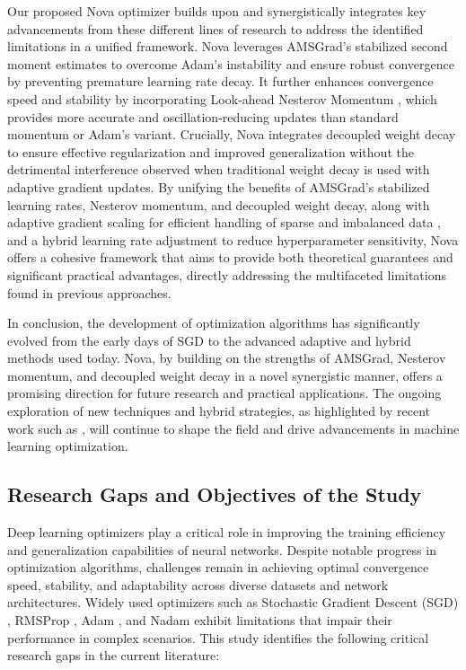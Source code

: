 \documentclass{article}
\begin{document}
Our proposed Nova optimizer builds upon and synergistically integrates key advancements from these different lines of research to address the identified limitations in a unified framework. Nova leverages AMSGrad's stabilized second moment estimates \cite{Reddi2018} to overcome Adam's instability and ensure robust convergence by preventing premature learning rate decay. It further enhances convergence speed and stability by incorporating Look-ahead Nesterov Momentum \cite{nesterov1983method}, which provides more accurate and oscillation-reducing updates than standard momentum or Adam's variant. Crucially, Nova integrates decoupled weight decay \cite{Loshchilov2017} to ensure effective regularization and improved generalization without the detrimental interference observed when traditional weight decay is used with adaptive gradient updates. By unifying the benefits of AMSGrad's stabilized learning rates, Nesterov momentum, and decoupled weight decay, along with adaptive gradient scaling for efficient handling of sparse and imbalanced data \cite{Johnson2020}, and a hybrid learning rate adjustment to reduce hyperparameter sensitivity, Nova offers a cohesive framework that aims to provide both theoretical guarantees and significant practical advantages, directly addressing the multifaceted limitations found in previous approaches.

In conclusion, the development of optimization algorithms has significantly evolved from the early days of SGD to the advanced adaptive and hybrid methods used today. Nova, by building on the strengths of AMSGrad, Nesterov momentum, and decoupled weight decay in a novel synergistic manner, offers a promising direction for future research and practical applications. The ongoing exploration of new techniques and hybrid strategies, as highlighted by recent work such as \cite{N1, N2, N3}, will continue to shape the field and drive advancements in machine learning optimization.








\subsection{Research Gaps and Objectives of the Study}

Deep learning optimizers play a critical role in improving the training efficiency and generalization capabilities of neural networks. Despite notable progress in optimization algorithms, challenges remain in achieving optimal convergence speed, stability, and adaptability across diverse datasets and network architectures. Widely used optimizers such as Stochastic Gradient Descent (SGD) \cite{Robbins1951}, RMSProp \cite{Tieleman2012}, Adam \cite{kingma2014adam}, and Nadam \cite{Dozat2016} exhibit limitations that impair their performance in complex scenarios. This study identifies the following critical research gaps in the current literature:
\end{document}
